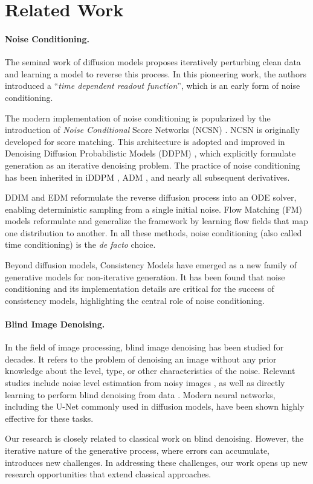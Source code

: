 \section{Related Work}
\label{sec:related}

\paragraph{Noise Conditioning.} The seminal work of diffusion models \cite{sohl2015diffusion} proposes iteratively perturbing clean data and learning a model to reverse this process. In this pioneering work, the authors introduced a ``\textit{time dependent readout function}'', which is an early form of noise conditioning.

The modern implementation of noise conditioning is popularized by the introduction of \textit{Noise Conditional} Score Networks (NCSN) \cite{song2019ncsn}. NCSN is originally developed for score matching.
This architecture is adopted and improved in Denoising Diffusion Probabilistic Models (DDPM) \cite{ho2020denoising}, which explicitly formulate generation as an iterative denoising problem. The practice of noise conditioning has been inherited in iDDPM \cite{nichol2021iddpm}, ADM \cite{dhariwal2021diffusion}, and nearly all subsequent derivatives.

DDIM \cite{song2021ddim} and EDM \cite{karras2022edm} reformulate the reverse diffusion process into an ODE solver, enabling deterministic sampling from a single initial noise. Flow Matching (FM) models \cite{lipman2023flow,liu2023flow,albergo2023stochastic} reformulate and generalize the framework by learning flow fields that map one distribution to another. In all these methods, noise conditioning (also called time conditioning) is the \textit{de facto} choice.

Beyond diffusion models, Consistency Models \cite{song2023consistency} have emerged as a new family of generative models for non-iterative generation. It has been found \cite{song2024improved} that noise conditioning and its implementation details are critical for the success of consistency models, highlighting the central role of noise conditioning.


\paragraph{Blind Image Denoising.} In the field of image processing, blind image denoising has been studied for decades. It refers to the problem of denoising an image without any prior knowledge about the level, type, or other characteristics of the noise. Relevant studies include noise level estimation from noisy images \cite{stahl2000quantile,shin2005block,liu2013single,chen2015efficient}, as well as directly learning to perform blind denoising from data \cite{liu2007automatic,chen2018image,batson2019noise2self,zhang2023blind}. Modern neural networks, including the \mbox{U-Net} \cite{ronneberger2015u} commonly used in diffusion models, have been shown highly effective for these tasks.

Our research is closely related to classical work on blind denoising. However, the iterative nature of the generative process, where errors can accumulate, introduces new challenges. In addressing these challenges, our work opens up new research opportunities that extend classical approaches.